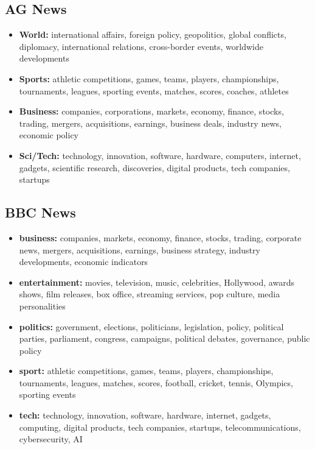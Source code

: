 \documentclass[sigconf,nonacm]{acmart}
\begin{document}
\subsection{AG News}

\begin{itemize}
\item \textbf{World:} international affairs, foreign policy, geo\-politics, global conflicts, diplomacy, international relations, cross-border events, worldwide develop\-ments

\item \textbf{Sports:} athletic competitions, games, teams, players, champion\-ships, tournaments, leagues, sporting events, matches, scores, coaches, athletes

\item \textbf{Business:} companies, corporations, markets, economy, finance, stocks, trading, mergers, acquisitions, earnings, business deals, industry news, economic policy

\item \textbf{Sci/Tech:} technology, innovation, software, hardware, computers, internet, gadgets, scientific research, discoveries, digital products, tech companies, startups
\end{itemize}

\subsection{BBC News}

\begin{itemize}
\item \textbf{business:} companies, markets, economy, finance, stocks, trading, corporate news, mergers, acquisitions, earnings, business strategy, industry develop\-ments, economic indicators

\item \textbf{entertainment:} movies, television, music, celebrities, Holly\-wood, awards shows, film releases, box office, streaming services, pop culture, media personalities

\item \textbf{politics:} government, elections, politicians, legislation, policy, political parties, parliament, congress, campaigns, political debates, governance, public policy

\item \textbf{sport:} athletic competitions, games, teams, players, champion\-ships, tournaments, leagues, matches, scores, football, cricket, tennis, Olympics, sporting events

\item \textbf{tech:} technology, innovation, software, hardware, internet, gadgets, computing, digital products, tech companies, startups, tele\-communications, cyber\-security, AI
\end{itemize}
\end{document}
